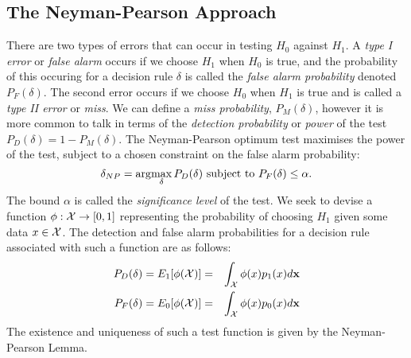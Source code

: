 \subsection{The Neyman-Pearson Approach}
There are two types of errors that can occur in testing $H_0$ against $H_1$. A \textit{type I error} or \textit{false alarm} occurs if we choose $H_1$ when $H_0$ is true, and the probability of this occuring for a decision rule $\delta$ is called the \textit{false alarm probability} denoted $P_F(\delta)$. The second error occurs if we choose $H_0$ when $H_1$ is true and is called a \textit{type II error} or \textit{miss}. We can define a \textit{miss probability}, $P_M(\delta)$, however it is more common to talk in terms of the \textit{detection probability} or \textit{power} of the test $P_D(\delta)=1-P_M(\delta)$. The Neyman-Pearson optimum test maximises the power of the test, subject to a chosen constraint on the false alarm probability:
\begin{equation}
\delta_{NP}=\arg\!\max_{\delta} P_D(\delta) \mbox{ subject to } P_F(\delta)\leq \alpha.
\end{equation}
The bound $\alpha$ is called the \textit{significance level} of the test. We seek to devise a function $\phi: \mathcal{X} \rightarrow [0,1]$ representing the probability of choosing $H_1$ given some data $x\in \mathcal{X}$. The detection and false alarm probabilities for a decision rule associated with such a function are as follows:
\begin{eqnarray}
P_D(\delta) = E_1[\phi(\mathcal{X})]  &=& \int_{\mathcal{X}} \phi(x) p_1(x) d{\mathbf{x}}  \label{eq:PDrandomised} \\
P_F(\delta) = E_0[\phi(\mathcal{X})]  &=& \int_{\mathcal{X}} \phi(x) p_0(x) d{\mathbf{x}} \label{eq:PFrandomised}
\end{eqnarray}
The existence and uniqueness of such a test function is given by the Neyman-Pearson Lemma.

